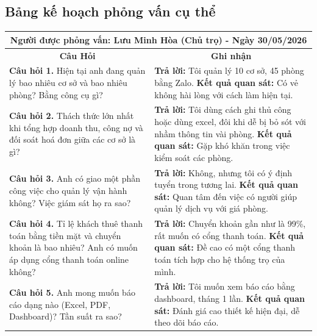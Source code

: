 \documentclass[a4paper,oneside]{report}
\begin{document}
\subsection{Bảng kế hoạch phỏng vấn cụ thể}

\noindent
\begin{tabularx}{\textwidth}{|p{}|X|}
\hline
\multicolumn{2}{|c|}{\textbf{Người được phỏng vấn: Lưu Minh Hòa (Chủ trọ) - Ngày 30/05/2026}} \\ \hline
\multicolumn{1}{|c|}{\textbf{Câu Hỏi}} & \multicolumn{1}{|c|}{\textbf{Ghi nhận}} \\ \hline
\textbf{\color{red}Câu hỏi 1.} Hiện tại anh đang quản lý bao nhiêu cơ sở và bao nhiêu phòng? Bằng công cụ gì? & \textbf{\color{red}Trả lời:} Tôi quản lý 10 cơ sở, 45 phòng bằng Zalo. \newline
\textbf{\color{red}Kết quả quan sát:} Có vẻ không hài lòng với cách làm hiện tại. \\ \hline
\textbf{\color{red}Câu hỏi 2.} Thách thức lớn nhất khi tổng hợp doanh thu, công nợ và đối soát hoá đơn giữa các cơ sở là gì? & \textbf{\color{red}Trả lời:} Tôi dùng cách ghi thủ công hoặc dùng excel, đôi khi dễ bị bỏ sót với nhầm thông tin vài phòng. \newline
\textbf{\color{red}Kết quả quan sát:} Gặp khó khăn trong việc kiểm soát các phòng. \\ \hline
\textbf{\color{red}Câu hỏi 3.} Anh có giao một phần công việc cho quản lý vận hành không? Việc giám sát họ ra sao? & \textbf{\color{red}Trả lời:} Không, nhưng tôi có ý định tuyển trong tương lai. \newline
\textbf{\color{red}Kết quả quan sát:} Quan tâm đến việc có người giúp quản lý dịch vụ với giá phòng. \\ \hline
\textbf{\color{red}Câu hỏi 4.} Tỉ lệ khách thuê thanh toán bằng tiền mặt và chuyển khoản là bao nhiêu? Anh có muốn áp dụng cổng thanh toán online không? & \textbf{\color{red}Trả lời:} Chuyển khoản gần như là 99\%, rất muốn có cổng thanh toán. \newline
\textbf{\color{red}Kết quả quan sát:} Đề cao có một cổng thanh toán tích hợp cho hệ thống trọ của mình. \\ \hline
\textbf{\color{red}Câu hỏi 5.} Anh mong muốn báo cáo dạng nào (Excel, PDF, Dashboard)? Tần suất ra sao? & \textbf{\color{red}Trả lời:} Tôi muốn xem báo cáo bằng dashboard, tháng 1 lần. \newline
\textbf{\color{red}Kết quả quan sát:} Đánh giá cao thiết kế hiện đại, dễ theo dõi báo cáo. \\ \hline
\end{tabularx}
\end{document}
